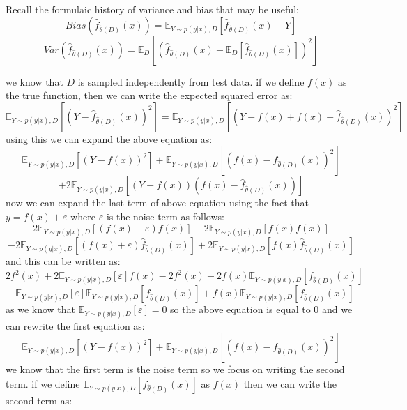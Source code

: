 Recall the formulaic history of variance and bias that may be useful:
\[
Bias \left( \hat{f}_{\hat{\theta}(D)}(x) \right) = \mathbb{E}_{Y \sim p(y|x),D} \left[ \hat{f}_{\hat{\theta}(D)}(x) - Y \right]
\]
\[
Var \left( \hat{f}_{\hat{\theta}(D)}(x) \right) = \mathbb{E}_D \left[ \left( \hat{f}_{\hat{\theta}(D)}(x) - \mathbb{E}_D \left[ \hat{f}_{\hat{\theta}(D)}(x) \right] \right)^2 \right]
\]
\begin{qsolve}
	\begin{qsolve}[]
		we know that $D$ is sampled independently from test data. if we define $f(x)$ as the true function, then we can write the expected squared error as:
		\[
		\mathbb{E}_{Y \sim p(y|x),D} \left[ (Y - \hat{f}_{\hat{\theta}(D)}(x))^2 \right] = \mathbb{E}_{Y \sim p(y|x),D} \left[ (Y - f(x) + f(x) - \hat{f}_{\hat{\theta}(D)}(x))^2 \right]
		\]
		using this we can expand the above equation as:
		$$
		\mathbb{E}_{Y \sim p(y|x),D} \left[ (Y - f(x))^2 \right] + \mathbb{E}_{Y \sim p(y|x),D} \left[ (f(x) - \hat{f}_{\hat{\theta}(D)}(x))^2 \right] $$
		$$
		+ 2\mathbb{E}_{Y \sim p(y|x),D} \left[ (Y - f(x))(f(x) - \hat{f}_{\hat{\theta}(D)}(x)) \right]
		$$
		now we can expand the last term of above equation using the fact that $y = f(x) + \varepsilon$ where $\varepsilon$ is the noise term as follows:
		$$
		2\mathbb{E}_{Y \sim p(y|x),D} \left[ (f(x) + \varepsilon ) f(x) \right] - 2\mathbb{E}_{Y \sim p(y|x),D} \left[ f(x)f(x) \right] 
		$$
		$$
		-2\mathbb{E}_{Y \sim p(y|x),D} \left[ (f(x) + \varepsilon)\hat{f}_{\hat{\theta}(D)}(x) \right] + 2\mathbb{E}_{Y \sim p(y|x),D} \left[ f(x)\hat{f}_{\hat{\theta}(D)}(x) \right]
		$$
		and this can be written as:
		$$
		2f^2(x) + 2\mathbb{E}_{Y \sim p(y|x),D} \left[ \varepsilon \right] f(x) - 2f^2(x) - 2f(x)\mathbb{E}_{Y \sim p(y|x),D} \left[ f_{\hat{\theta}(D)}(x) \right] $$
		$$
		- \mathbb{E}_{Y \sim p(y|x),D} \left[ \varepsilon\right] \mathbb{E}_{Y \sim p(y|x),D} \left[ f_{\hat{\theta}(D)}(x) \right] + f(x)\mathbb{E}_{Y \sim p(y|x),D} \left[ f_{\hat{\theta}(D)}(x) \right]
		$$
		\splitqsolve[\splitqsolve]
		as we know that $\mathbb{E}_{Y \sim p(y|x),D} \left[ \varepsilon \right] = 0$ so the above equation is equal to $0$ and we can rewrite the first equation as:
		$$
		\mathbb{E}_{Y \sim p(y|x),D} \left[ (Y - f(x))^2 \right] + \mathbb{E}_{Y \sim p(y|x),D} \left[ (f(x) - \hat{f}_{\hat{\theta}(D)}(x))^2 \right] 
		$$
		we know that the first term is the noise term so we focus on writing the second term. if we define $\mathbb{E}_{Y \sim p(y|x),D} \left[ f_{\hat{\theta}(D)}(x) \right]$ as $\bar{f}(x)$ then we can write the second term as:

\end{qsolve}
\end{qsolve}
